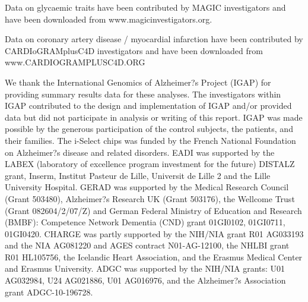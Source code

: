 \documentclass[11pt,titlepage]{article}
\begin{document}
Data on glycaemic traits have been contributed by MAGIC investigators and have been downloaded from www.magicinvestigators.org.

Data on coronary artery disease / myocardial infarction have been contributed by CARDIoGRAMplusC4D investigators and have been downloaded from www.CARDIOGRAMPLUSC4D.ORG

We thank the International Genomics of Alzheimer?s Project (IGAP) for providing summary results data for these analyses. The investigators within IGAP contributed to the design and implementation of IGAP and/or provided data but did not participate in analysis or writing of this report. IGAP was made possible by the generous participation of the control subjects, the patients, and their families. The i-Select chips was funded by the French National Foundation on Alzheimer?s disease and related disorders. EADI was supported by the LABEX (laboratory of excellence program investment for the future) DISTALZ grant, Inserm, Institut Pasteur de Lille, Universit de Lille 2 and the Lille University Hospital. GERAD was supported by the Medical Research Council (Grant 503480), Alzheimer?s Research UK (Grant 503176), the Wellcome Trust (Grant 082604/2/07/Z) and German Federal Ministry of Education and Research (BMBF): Competence Network Dementia
(CND) grant 01GI0102, 01GI0711, 01GI0420. CHARGE was partly supported by the NIH/NIA grant R01 AG033193 and the NIA AG081220 and AGES contract N01-AG-12100, the NHLBI grant R01 HL105756, the Icelandic Heart Association, and the Erasmus Medical Center and Erasmus University. ADGC was supported by the NIH/NIA grants: U01 AG032984, U24 AG021886, U01 AG016976, and the Alzheimer?s Association grant ADGC-10-196728.


\end{document}
